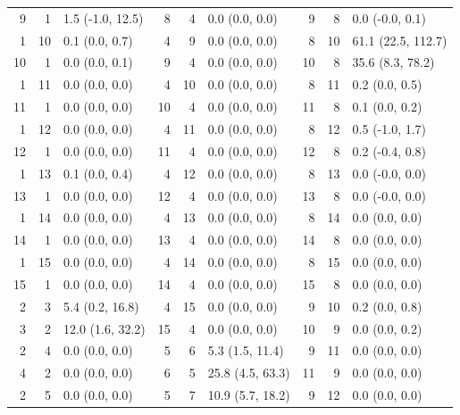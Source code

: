 \begin{table}
\begin{tabular}{|rrl||rrl||rrl|}
       9 &    1 &  1.5 (-1.0, 12.5) &    8 &    4 &     0.0 (0.0, 0.0) &    9 &    8 &     0.0 (-0.0, 0.1) \\
       1 &   10 &    0.1 (0.0, 0.7) &    4 &    9 &     0.0 (0.0, 0.0) &    8 &   10 &  61.1 (22.5, 112.7) \\
      10 &    1 &    0.0 (0.0, 0.1) &    9 &    4 &     0.0 (0.0, 0.0) &   10 &    8 &    35.6 (8.3, 78.2) \\
       1 &   11 &    0.0 (0.0, 0.0) &    4 &   10 &     0.0 (0.0, 0.0) &    8 &   11 &      0.2 (0.0, 0.5) \\
      11 &    1 &    0.0 (0.0, 0.0) &   10 &    4 &     0.0 (0.0, 0.0) &   11 &    8 &      0.1 (0.0, 0.2) \\
       1 &   12 &    0.0 (0.0, 0.0) &    4 &   11 &     0.0 (0.0, 0.0) &    8 &   12 &     0.5 (-1.0, 1.7) \\
      12 &    1 &    0.0 (0.0, 0.0) &   11 &    4 &     0.0 (0.0, 0.0) &   12 &    8 &     0.2 (-0.4, 0.8) \\
       1 &   13 &    0.1 (0.0, 0.4) &    4 &   12 &     0.0 (0.0, 0.0) &    8 &   13 &     0.0 (-0.0, 0.0) \\
      13 &    1 &    0.0 (0.0, 0.0) &   12 &    4 &     0.0 (0.0, 0.0) &   13 &    8 &     0.0 (-0.0, 0.0) \\
       1 &   14 &    0.0 (0.0, 0.0) &    4 &   13 &     0.0 (0.0, 0.0) &    8 &   14 &      0.0 (0.0, 0.0) \\
      14 &    1 &    0.0 (0.0, 0.0) &   13 &    4 &     0.0 (0.0, 0.0) &   14 &    8 &      0.0 (0.0, 0.0) \\
       1 &   15 &    0.0 (0.0, 0.0) &    4 &   14 &     0.0 (0.0, 0.0) &    8 &   15 &      0.0 (0.0, 0.0) \\
      15 &    1 &    0.0 (0.0, 0.0) &   14 &    4 &     0.0 (0.0, 0.0) &   15 &    8 &      0.0 (0.0, 0.0) \\
       2 &    3 &   5.4 (0.2, 16.8) &    4 &   15 &     0.0 (0.0, 0.0) &    9 &   10 &      0.2 (0.0, 0.8) \\
       3 &    2 &  12.0 (1.6, 32.2) &   15 &    4 &     0.0 (0.0, 0.0) &   10 &    9 &      0.0 (0.0, 0.2) \\
       2 &    4 &    0.0 (0.0, 0.0) &    5 &    6 &    5.3 (1.5, 11.4) &    9 &   11 &      0.0 (0.0, 0.0) \\
       4 &    2 &    0.0 (0.0, 0.0) &    6 &    5 &   25.8 (4.5, 63.3) &   11 &    9 &      0.0 (0.0, 0.0) \\
       2 &    5 &    0.0 (0.0, 0.0) &    5 &    7 &   10.9 (5.7, 18.2) &    9 &   12 &      0.0 (0.0, 0.0) \\

\end{tabular}
\end{table}
